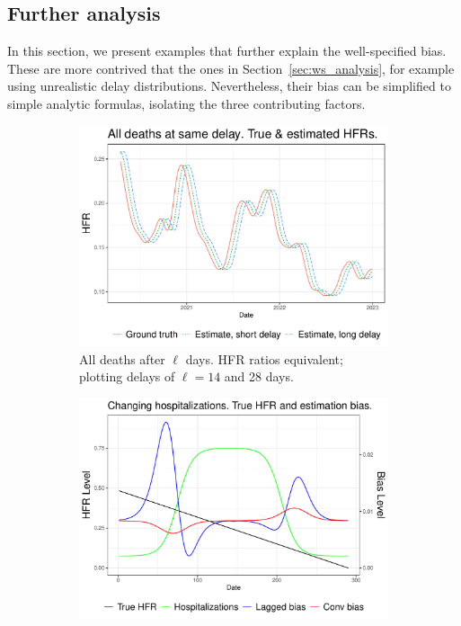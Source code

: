 \documentclass{article}
\begin{document}
\subsection{Further analysis}\label{apx:analysis}
In this section, we present examples that further explain the well-specified bias. These are more contrived that the ones in Section~\ref{sec:ws_analysis}, for example using unrealistic delay distributions. Nevertheless, their bias can be simplified to simple analytic formulas, isolating the three contributing factors.

\begin{figure}
     \centering
     \begin{subfigure}[b]{0.45\linewidth}
         \centering
         \includegraphics[width=\linewidth]{Figures/Simulated/sim_onehot.pdf}
         \caption{All deaths after $\ell$ days. HFR ratios equivalent; plotting delays of $\ell=14$ and 28 days.}
         \label{fig:onehot}
     \end{subfigure}
     \hfill
     \begin{subfigure}[b]{0.45\linewidth}
         \centering
         \includegraphics[width=\linewidth]{Figures/Simulated/sim_chging_primary.pdf}

\end{subfigure}
\end{figure}
\end{document}
